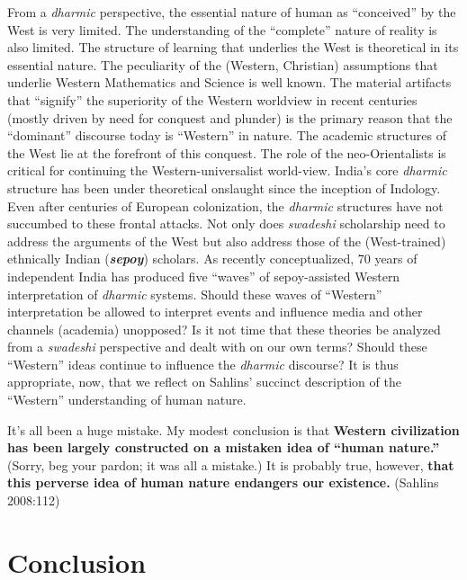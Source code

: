 From a \textit{dharmic} perspective, the essential nature of human as “conceived” by the West is very limited. The understanding of the “complete” nature of reality is also limited. The structure of learning that underlies the West is theoretical in its essential nature. The peculiarity of the (Western, Christian) assumptions that underlie Western Mathematics and Science is well known. The material artifacts that “signify” the superiority of the Western worldview in recent centuries (mostly driven by need for conquest and plunder) is the primary reason that the “dominant” discourse today is “Western” in nature. The academic structures of the West lie at the forefront of this conquest. The role of the neo-Orientalists is critical for continuing the Western-universalist world-view. India's core \textit{dharmic} structure has been under theoretical onslaught since the inception of Indology. Even after centuries of European colonization, the \textit{dharmic} structures have not succumbed to these frontal attacks. Not only does \textit{swadeshi} scholarship need to address the arguments of the West but also address those of the (West-trained) ethnically Indian (\textbf{\textit{sepoy}}) scholars. As recently conceptualized, 70 years of independent India has produced five “waves” of sepoy-assisted Western interpretation of \textit{dharmic} systems. Should these waves of “Western” interpretation be allowed to interpret events and influence media and other channels (academia) unopposed? Is it not time that these theories be analyzed from a \textit{swadeshi} perspective and dealt with on our own terms? Should these “Western” ideas continue to influence the \textit{dharmic} discourse? It is thus appropriate, now, that we reflect on Sahlins' succinct description of the “Western” understanding of human nature.

\begin{myquote}
It's all been a huge mistake. My modest conclusion is that \textbf{Western civilization has been largely constructed on a mistaken idea of “human nature.”} (Sorry, beg your pardon; it was all a mistake.) It is probably true, however, \textbf{that this perverse idea of human nature endangers our existence.} \hfill (Sahlins 2008:112)
\end{myquote}


\section*{Conclusion}

